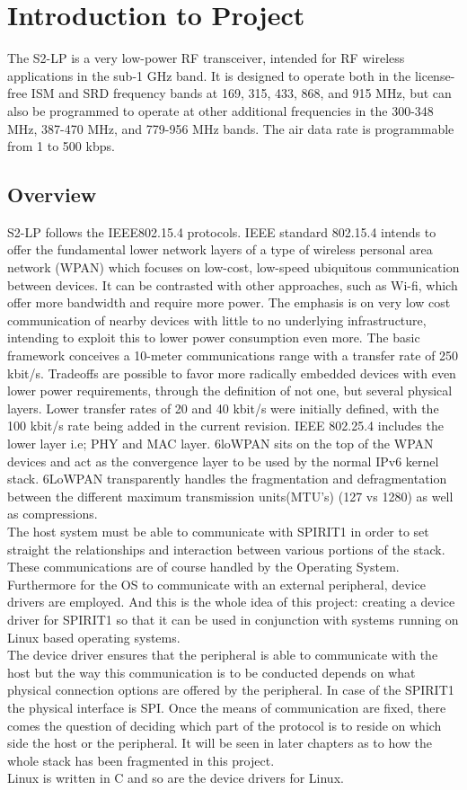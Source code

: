 \chapter{Introduction to Project}
The S2-LP is a very low-power RF transceiver, intended for RF wireless applications in the sub-1 GHz band. It is designed to operate both in the license-free ISM and SRD frequency bands at 169, 315, 433, 868, and 915 MHz, but can also be programmed to operate at other additional frequencies in the 300-348 MHz, 387-470 MHz, and 779-956 MHz bands. The air data rate is programmable from 1 to 500 kbps. 
\section{Overview} 
\noindent S2-LP follows the IEEE802.15.4 protocols. IEEE standard 802.15.4 intends to offer the fundamental lower network layers of a type of wireless personal area network (WPAN) which focuses on low-cost, low-speed ubiquitous communication between devices. It can be contrasted with other approaches, such as Wi-fi, which offer more bandwidth and require more power. The emphasis is on very low cost communication of nearby devices with little to no underlying infrastructure, intending to exploit this to lower power consumption even more. The basic framework conceives a 10-meter communications range with a transfer rate of 250 kbit/s. Tradeoffs are possible to favor more radically embedded devices with even lower power requirements, through the definition of not one, but several physical layers. Lower transfer rates of 20 and 40 kbit/s were initially defined, with the 100 kbit/s rate being added in the current revision. IEEE 802.25.4 includes the lower layer i.e; PHY and MAC layer. 6loWPAN sits on the top of the WPAN devices and act as the convergence layer to be used by the normal IPv6 kernel stack. 6LoWPAN transparently handles the fragmentation and defragmentation between the different maximum transmission units(MTU’s) (127 vs 1280) as well as compressions.\\
\noindent The host system must be able to communicate with SPIRIT1 in order to set straight the relationships and interaction between various portions of the stack. These communications are of course handled by the Operating System. Furthermore for the OS to communicate with an external peripheral, device drivers are employed. And this is the whole idea of this project: creating a device driver for SPIRIT1 so that it can be used in conjunction with systems running on Linux based operating systems.\\
\noindent The device driver ensures that the peripheral is able to communicate with the host but the way this communication is to be conducted depends on what physical connection options are offered by the peripheral. In case of the SPIRIT1 the physical interface is SPI. Once the means of communication are fixed, there comes the question of deciding which part of the protocol is to reside on which side the host or the peripheral. It will be seen in later chapters as to how the whole stack has been fragmented in this project.\\
\noindent Linux is written in C and so are the device drivers for Linux. 
